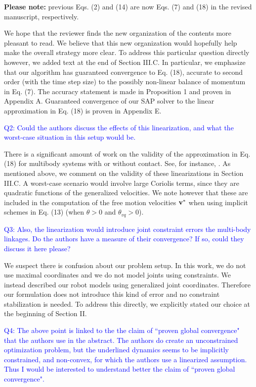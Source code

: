 \textbf{Please note:} previous Eqs. (2) and (14) are now Eqs. (7) and (18) in the
revised manuscript, respectively.

We hope that the reviewer finds the new organization of the contents more
pleasant to read. We believe that this new organization would hopefully help
make the overall strategy more clear. To address this particular question
directly however, we added text at the end of Section III.C. In particular, we
emphasize that our algorithm has guaranteed convergence to Eq. (18), accurate to
second order (with the time step size) to the possibly non-linear balance of
momentum in Eq. (7). The accuracy statement is made in Proposition 1 and proven
in Appendix A. Guaranteed convergence of our SAP solver to the linear
approximation in Eq. (18) is proven in Appendix E.
\vspace{5mm}

\textcolor{blue}{
Q2: Could the authors discuss the effects of this linearization, and what the
worst-case situation in this setup would be. }

There is a significant amount of work on the validity of the approximation in
Eq. (18) for multibody systems with or without contact. See, for instance,
\cite{bib:potra2006linearly}. As mentioned above, we comment on the validity of
these linearizations in Section III.C. A worst-case scenario would involve large
Coriolis terms, since they are quadratic functions of the generalized
velocities. We note however that these are included in the computation of the
free motion velocities ${\mathbf{v}}^*$ when using implicit schemes in Eq. (13) (when
$\theta>0$ and $\theta_{vq}>0$).
\vspace{5mm}

\textcolor{blue}{
Q3: Also, the linearization would introduce joint constraint errors the
multi-body linkages. Do the authors have a measure of their convergence? If so,
could they discuss it here please?}

We suspect there is confusion about our problem setup. In this work, we do not
use maximal coordinates and we do not model joints using constraints. We instead
described our robot models using generalized joint coordinates. Therefore our
formulation does not introduce this kind of error and no constraint
stabilization is needed. To address this directly, we explicitly stated our
choice at the beginning of Section II.
\vspace{5mm}

\textcolor{blue}{
Q4: The above point is linked to the the claim of ``proven global convergence"
that the authors use in the abstract. The authors do create an unconstrained
optimization problem, but the underlined dynamics seems to be implicitly
constrained, and non-convex, for which the authors use a linearized
assumption. Thus I would be interested to understand better the claim of ``proven global
convergence".}

